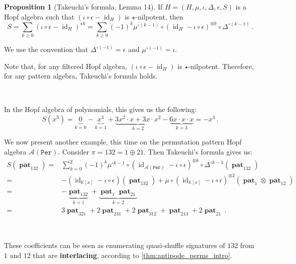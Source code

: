 \documentclass[12pt, reqno]{amsart}
\theoremstyle{definition}
\newtheorem{prop}[thm]{Proposition}
\DeclareMathOperator{\id}{id}
\DeclareMathOperator{\pat}{\mathbf{pat}}
\begin{document}
\begin{prop}[Takeuchi's formula, Lemma 14]\label{lm:takeuchi}
If $H = (H, \mu, \iota, \Delta, \epsilon, S)$ is a Hopf algebra such that $(\iota\circ \epsilon - \id_H)$ is $\star$-nilpotent, then 
\begin{equation}\label{eq:eq1}
S = \sum_{k\geq 0 }  ( \iota  \circ\epsilon- \id_H)^{\star k} = \sum_{k\geq 0} (-1)^k \mu^{\circ (k-1)} \circ (\id_{H} - \iota \circ \epsilon)^{\otimes k} \circ \Delta^{\circ (k-1)}\, .
\end{equation}

We use the convention that $\Delta^{\circ (-1)} = \epsilon $ and $\mu^{\circ (-1)} = \iota$.
\end{prop}

Note that, for any filtered Hopf algebra, $( \iota \circ \epsilon - \id_H)$ is $\star$-nilpotent.
Therefore, for any pattern algebra, Takeuchi's formula holds.

\

In the Hopf algebra of polynomials, this gives us the following:
$$S(x^3) = \underbrace{0}_{k = 0} - \underbrace{x^3}_{k = 1} + \underbrace{3 x^2 \cdot x + 3 x \cdot x^2}_{k=2} - \underbrace{6 x \cdot x \cdot x}_{k = 3} = - x^3 \, .$$


We now present another example, this time on the permutation pattern Hopf algebra $\mathcal A(\mathtt{Per})$.
Consider $\pi = 132 = 1 \oplus 21$. Then Takeuchi's formula gives us:
\begin{align*}
S(\pat_{132}) =& \sum_{k=0}^2 (-1)^k \mu^{\circ k-1} \circ (\id_{\mathcal A(\mathtt{Per})} - \iota \circ \epsilon)^{\otimes k} \circ \Delta^{\circ k-1}(\pat_{132})\\
=& -(\id_{\mathbb{K}[x]} - \iota \circ \epsilon)(\pat_{132}) + \mu \circ (\id_{\mathbb{K}[x]} - \iota\circ\epsilon)^{\otimes 2}(\pat_1 \otimes \pat_{12}) \\
=& - \underbrace{\pat_{132}}_{k=1} + \underbrace{\pat_1 \pat_{21}}_{k=2} \\
=& 3 \pat_{321} + 2 \pat_{231} + 2 \pat_{312} + \pat_{213} + 2 \pat_{21} \, .
\end{align*}

\

These coefficients can be seen as enumerating quasi-shuffle signatures of $132$ from $1$ and $12$ that are \textbf{interlacing}, according to \cref{thm:antipode_perms_intro}.



\
\end{document}
